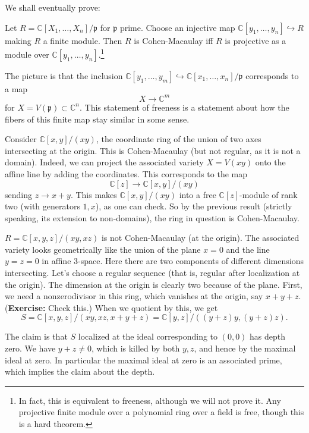 We shall eventually prove:

\begin{proposition}
Let $R = \mathbb{C}[X_1, \dots, X_n]/\mathfrak{p}$ for
$\mathfrak{p}$ prime.
Choose an injective map $\mathbb{C}[y_1, \dots, y_n]
\hookrightarrow R$ making $R$ a
finite module. Then $R$ is Cohen-Macaulay iff $R$ is projective
as a module
over $\mathbb{C}[y_1, \dots, y_n]$.\footnote{In fact, this is
equivalent to
freeness, although we will not prove it. Any projective finite
module over a
polynomial ring over a field is free, though this is a hard
theorem.}
\end{proposition}

The picture is that the inclusion $\mathbb{C}[y_1, \dots, y_m ]
\hookrightarrow
\mathbb{C}[x_1, \dots, x_n]/\mathfrak{p}$ corresponds to a map
\[ X \to \mathbb{C}^m  \]
for $X = V(\mathfrak{p}) \subset \mathbb{C}^n$. This statement
of freeness is a
statement about how the fibers of this finite map stay similar
in some sense.

\begin{example}
Consider $\mathbb{C}[x,y]/(xy)$, the coordinate ring of the
union of two axes
intersecting at the origin. This is Cohen-Macaulay (but not
regular, as it
is not a domain). Indeed, we can project the associated variety
$X = V(xy)$
onto the affine line by adding the coordinates. This corresponds
to the map
\[ \mathbb{C}[z] \to \mathbb{C}[x,y]/(xy)  \]
sending $z \to x+y$. This makes $\mathbb{C}[x,y]/(xy)$ into a
free
$\mathbb{C}[z]$-module of rank two (with generators $1, x$), as
one can check.
So by the previous result (strictly speaking, its extension to
non-domains),
the ring in question is Cohen-Macaulay.
\end{example}

\begin{example}
$R=\mathbb{C}[x,y,z]/(xy, xz)$ is not Cohen-Macaulay (at the
origin). The associated variety looks
geometrically like the union of the plane $x=0$ and the line
$y=z=0$ in affine
3-space. Here there are two components of different dimensions
intersecting.
Let's choose a regular sequence (that is, regular after
localization at the
origin). The dimension at the origin is clearly two because of
the plane.
First, we need a nonzerodivisor in this ring, which vanishes at
the origin, say
$ x+y+z$. (\textbf{Exercise:} Check this.) When we quotient by
this, we get
\[ S=\mathbb{C}[x,y,z]/(xy,xz, x+y+z) = \mathbb{C}[y,z]/(
(y+z)y, (y+z)z). \]

The claim is that $S$ localized at the ideal corresponding to
$(0,0)$ has depth
zero. We have $y+z \neq 0$, which is killed by both $y,z$, and
hence by the
maximal ideal at zero. In particular the maximal ideal at zero
is an associated
prime, which implies the claim about the depth.
\end{example}

